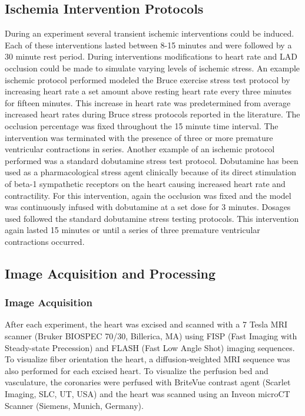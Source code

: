 \documentclass[twocolumn]{cinc}
\begin{document}
\subsection{Ischemia Intervention Protocols}

During an experiment several transient ischemic interventions could be induced. Each of these interventions lasted between 8-15 minutes and were followed by a 30 minute rest period. During interventions modifications to heart rate and LAD occlusion could be made to simulate varying levels of ischemic stress. An example ischemic protocol performed modeled the Bruce exercise stress test protocol by increasing heart rate a set amount above resting heart rate every three minutes for fifteen minutes. This increase in heart rate was predetermined from average increased heart rates during Bruce stress protocols reported in the literature. \cite{Okin1986a} The occlusion percentage was fixed throughout the 15 minute time interval. The intervention was terminated with the presence of three or more premature ventricular contractions in series. Another example of an ischemic protocol performed was a standard dobutamine stress test protocol. Dobutamine has been used as a pharmacological stress agent clinically because of its direct stimulation of beta-1 sympathetic receptors on the heart causing increased heart rate and contractility. For this intervention, again the occlusion was fixed and the model was continuously infused with dobutamine at a set dose for 3 minutes. Dosages used followed the standard dobutamine stress testing protocols. \cite{Secknus1997} This intervention again lasted 15 minutes or until a series of three premature ventricular contractions occurred. 

\subsection{Image Acquisition and Processing}

\subsubsection{Image Acquisition}

After each experiment, the heart was excised and scanned with a 7 Tesla MRI scanner (Bruker BIOSPEC 70/30, Billerica, MA) using FISP (Fast Imaging with  Steady-state Precession) and FLASH (Fast Low Angle Shot) imaging  sequences. To visualize fiber orientation the heart, a diffusion-weighted MRI sequence was also performed for each excised heart. To visualize the perfusion bed and vasculature, the coronaries were perfused with BriteVue contrast agent (Scarlet Imaging, SLC, UT, USA) and the heart was scanned using an Inveon microCT Scanner (Siemens, Munich, Germany). 
\end{document}
